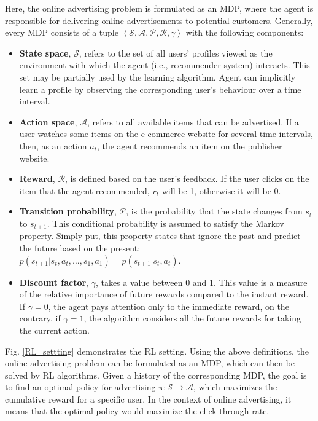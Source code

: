 \documentclass[journal]{IEEEtran}
\begin{document}
Here, the online advertising problem is formulated as an MDP, where the agent is responsible for delivering online advertisements to potential customers. Generally, every MDP consists of a tuple $\left\langle\mathcal{S},\mathcal{A},\mathcal{P},\mathcal{R},\gamma\right\rangle$ with the following components:
\begin{itemize}
\item 
\textbf{State space}, $\mathcal{S}$, refers to the set of all users' profiles viewed as the environment with which the agent (i.e., recommender system) interacts. This set may be partially used by the learning algorithm. Agent can implicitly learn a profile by observing the corresponding user's behaviour over a time interval.
\item 
\textbf{Action space}, $\mathcal{A}$, refers to all available items that can be advertised. If a user watches some items on the e-commerce website for several time intervals, then, as an action $a_t$, the agent recommends an item on the publisher website.
\item 
\textbf{Reward}, $\mathcal{R}$, is defined based on the user's feedback. If the user clicks on the item that the agent recommended, $r_t$ will be 1, otherwise it will be 0.
\item
\textbf{Transition probability}, $\mathcal{P}$, is the probability that the state changes from $s_t$ to $s_{t+1}$. This conditional probability is assumed to satisfy the Markov property. Simply put, this property states that ignore the past and predict the future based on the present: 
\\ $p\left( {{s}_{t+1}}|{{s}_{t}},{{a}_{t}},\ldots ,{{s}_{1}},{{a}_{1}} \right)=p\left( {{s}_{t+1}}|{{s}_{t}},{{a}_{t}} \right) $.
\item
\textbf{Discount factor}, $\gamma$, takes a value between 0 and 1. This value is a measure of the relative importance of future rewards compared to the instant reward. If $\gamma=0$, the agent pays attention only to the immediate reward, on the contrary, if $\gamma=1$, the algorithm considers all the future rewards for taking the current action.
\end{itemize}


Fig. \ref{RL_settting} demonstrates the RL setting. Using the above definitions, the online advertising problem can be formulated as an MDP, which can then  be solved by RL algorithms. Given a history of the corresponding MDP, the goal is to find an optimal policy for advertising $\pi : \mathcal{S} \to \mathcal{A}$, which maximizes the cumulative reward for a specific user. In the context of online advertising, it means that the optimal policy would maximize the click-through rate. 
\end{document}
